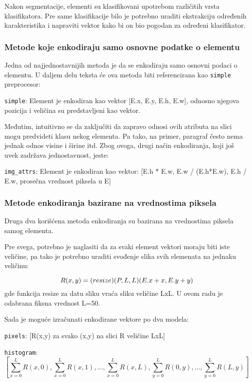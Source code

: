 \documentclass[]{amsart}
\begin{document}
Nakon segmentacije, elementi su klasifikovani upotrebom različitih vrsta klasifikatora. Pre same klasifikacije bilo je potrebno uraditi ekstrakciju
određenih karakteristika i napraviti vektor kako bi on bio pogodan za određeni klasifikator.




\subsubsection{Metode koje enkodiraju samo osnovne podatke o elementu}
\label{sec:orgd93cd26}

Jedna od najjednostavnijih metoda je da se enkodiraju samo osnovni podaci o elementu. U daljem delu teksta će ova metoda biti referencirana kao \texttt{simple} preprocesor:

\texttt{simple}: Element je enkodiran kao vektor [E.x, E.y, E.h, E.w], odnosno njegova pozicija i veličina su predstavljeni kao vektor.


Međutim, intuitivno se da zaključiti da zapravo odnosi ovih atributa na slici mogu predvideti klasu nekog elementa. Pa tako, na primer, paragraf
često nema jednak odnos visine i širine itd. Zbog ovoga, drugi način enkodiranja, koji još uvek zadržava jednostavnost, jeste:

\texttt{img\_attrs}: Element je enkodiran kao vektor:  [E.h * E.w, E.w / (E.h*E.w), E.h / E.w, prosečna vrednost piksela u E]

\subsubsection{Metode enkodiranja bazirane na vrednostima piksela}
\label{sec:org582acb2}

Druga dva korišćena metoda enkodiranja su bazirana na vrednostima piksela samog elementa.

Pre svega, potrebno je naglasiti da za svaki element vektori moraju biti iste veličine, pa tako je potrebno uraditi svođenje slika svih elemenata
na jednaku veličinu:

$$ R(x,y) = \text(resize)(P, L, L)(E.x + x, E.y + y) $$ gde funkcija resize za datu sliku vraća sliku veličine LxL. U ovom radu je odabrana fiksna vrednost L=50.

Sada je moguće izračunati enkodirane vektore po dva modela:

\texttt{pixels}: [R(x,y) za svako (x,y) na slici R veličine LxL]

\texttt{histogram}: $$ [\sum_{x=0}^L R(x, 0), \sum_{x=0}^L R(x, 1), ..., \sum_{x=0}^L R(x, L), \sum_{y=0}^L R(0, y), ...,  \sum_{y=0}^L R(L, y)] $$
\end{document}
